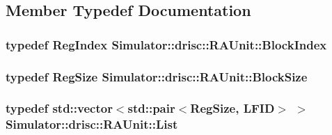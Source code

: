\subsection{Member Typedef Documentation}
\hypertarget{class_simulator_1_1drisc_1_1_r_a_unit_a8a53a5257420a14753fa3f205c17a01c}{
\subsubsection[{Block\+Index}]{\setlength{\rightskip}{0pt plus 5cm}typedef {\bf Reg\+Index} {\bf Simulator\+::drisc\+::\+R\+A\+Unit\+::\+Block\+Index}}}\label{class_simulator_1_1drisc_1_1_r_a_unit_a8a53a5257420a14753fa3f205c17a01c}
\hypertarget{class_simulator_1_1drisc_1_1_r_a_unit_aa5b30133d4961a3b8e06e4fda505ea3d}{
\subsubsection[{Block\+Size}]{\setlength{\rightskip}{0pt plus 5cm}typedef {\bf Reg\+Size} {\bf Simulator\+::drisc\+::\+R\+A\+Unit\+::\+Block\+Size}}}\label{class_simulator_1_1drisc_1_1_r_a_unit_aa5b30133d4961a3b8e06e4fda505ea3d}
\hypertarget{class_simulator_1_1drisc_1_1_r_a_unit_abd48271d9597ddbe20207e2a4e66d425}{
\subsubsection[{List}]{\setlength{\rightskip}{0pt plus 5cm}typedef std\+::vector$<$std\+::pair$<${\bf Reg\+Size}, {\bf L\+F\+I\+D}$>$ $>$ {\bf Simulator\+::drisc\+::\+R\+A\+Unit\+::\+List}}}\label{class_simulator_1_1drisc_1_1_r_a_unit_abd48271d9597ddbe20207e2a4e66d425}


